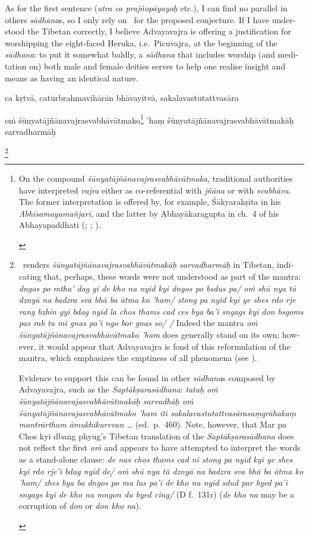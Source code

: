 \documentclass[naipra.tex]{subfiles}
\begin{document}
\begin{sanskrit}
{\begin{english}
		As for the first sentence (\emph{atra ca prajñopāyayoḥ} etc.), I can find no parallel in others \emph{sādhana}s, so I only rely on \TIB\ for the proposed conjecture. 
		If I have understood the Tibetan correctly, I believe Advayavajra is offering a justification for worshipping the eight-faced Heruka, i.e.\ Picuvajra, at the beginning of the \emph{sādhana}: to put it somewhat baldly, a \emph{sādhana} that includes worship (and meditation on) both male and female deities serves to help one realise insight and means as having an identical nature.
	\end{english}
}ca kṛtvā, caturbrahmavihārān bhāvayitvā, sakalavastutattvasāra \begin{mantra}oṁ śūnyatājñānavajrasvabhāvātmako\footnote{
	\begin{english}%
		On the compound \emph{śūnyatājñānavajrasvabhāvātmaka}, traditional authorities have interpreted \emph{vajra} either as co-referential with \emph{jñāna} or with \emph{svabhāva}.
		The former interpretation is offered by, for example, Śākyarakṣita in his \emph{Abhisamayamañjarī}, and the latter by Abhayākaragupta in ch.\ 4 of his Abhayapaddhati (\cite[239–40 n.\ 273, n.\ 277]{english2002}; \cite[292]{isaacson2007}; \cite[140, 234]{yang2014}).
	\end{english}
} 'haṃ śūnyatājñānavajrasvabhāvātmakāḥ sarvadharmāḥ\end{mantra}\footnote{
	\begin{english}%
		\TIB\ renders \emph{śūnyatājñānavajrasvabhāvātmakāḥ sarvadharmāḥ} in Tibetan, indicating that, perhaps, these words were not understood as part of the mantra: \emph{dngos po mtha' dag gi de kho na nyid kyi dngos po bsdus pa/ oṁ shū nya tā dznyā na badzra sva bhā ba ātma ko 'ham/ stong pa nyid kyi ye shes rdo rje rang bzhin gyi bdag nyid la chos thams cad ces bya ba'i sngags kyi don bsgoms pas rab tu mi gnas pa'i ngo bor gnas so/ /}
		Indeed the mantra \emph{oṁ śūnyatājñānavajrasvabhāvātmako 'ham} does generally stand on its own; however, it would appear that Advayavajra is fond of this reformulation of the mantra, which emphasizes the emptiness of all phenomena (see \cite[128]{english2002}).

		Evidence to support this can be found in other \emph{sādhana}s composed by Advayavajra, such as the \emph{Saptākṣarasādhana}: \emph{tataḥ oṁ śūnyatājñānavajasvabhāvātmakāḥ sarvadhāḥ oṁ śūnyatājñānavajasvabhāvātmako 'ham iti sakalavastutattvasārasaṃgrāhakaṃ mantrārtham āmukhīkurvvan \ldots } (ed.\ p.\ 460).
		Note, however, that Mar pa Chos kyi dbang phyug's Tibetan translation of the \emph{Saptākṣarasādhana} does not reflect the first \emph{oṁ} and appears to have attempted to interpret the words as a stand-alone clause: \emph{de nas chos thams cad ni stong pa nyid kyi ye shes kyi rdo rje'i bdag nyid de/ oṁ shū nya tā dznyā na badzra sva bhā ba ātma ko 'ham/ zhes bya ba dngos po ma lus pa'i de kho na nyid sdud par byed pa'i sngags kyi de kho na mngon du byed cing/} (D f.\ 131r) (\emph{de kho na} may be a corruption of \emph{don} or \emph{don kho na}).


\end{english}}
\end{sanskrit}
\end{document}

